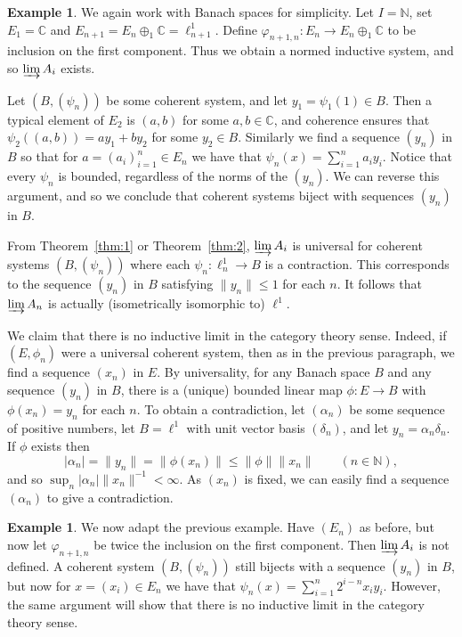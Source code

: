 \documentclass[a4paper,11pt]{article}
\newcommand{\indlim}{\varinjlim}
\theoremstyle{definition}
\newtheorem{example}[lemma]{Example}
\begin{document}
\begin{example}\label{ex:4}
We again work with Banach spaces for simplicity.
Let $I=\mathbb N$, set $E_1 = \mathbb C$ and $E_{n+1} = E_n \oplus_1 \mathbb C = \ell^1_{n+1}$.
Define $\varphi_{n+1,n} : E_n \rightarrow E_n \oplus_1 \mathbb C$ to be inclusion on the first
component.  Thus we obtain a normed inductive system, and so $\indlim A_i$ exists.

Let $(B,(\psi_n))$ be some coherent system, and let $y_1 = \psi_1(1) \in B$.  Then a typical element
of $E_2$ is $(a,b)$ for some $a,b\in\mathbb C$, and coherence ensures that $\psi_2((a,b)) = ay_1 +
by_2$ for some $y_2\in B$.  Similarly we find a sequence $(y_n)$ in $B$ so that for
$a = (a_i)_{i=1}^n \in E_n$ we have that $\psi_n(x) = \sum_{i=1}^n a_i y_i$.  Notice that every
$\psi_n$ is bounded, regardless of the norms of the $(y_n)$.  We can reverse this argument, and so
we conclude that coherent systems biject with sequences $(y_n)$ in $B$.

From Theorem~\ref{thm:1} or Theorem~\ref{thm:2}, $\indlim A_i$ is universal for coherent systems
$(B,(\psi_n))$ where each $\psi_n:\ell^1_n\rightarrow B$ is a contraction.  This corresponds to the
sequence $(y_n)$ in $B$ satisfying $\|y_n\|\leq 1$ for each $n$.  It follows that $\indlim A_n$ is
actually (isometrically isomorphic to) $\ell^1$.

We claim that there is no inductive limit in the category theory sense.  Indeed, if $(E,\phi_n)$
were a universal coherent system, then as in the previous paragraph, we find a sequence $(x_n)$ in
$E$.  By universality, for any Banach space $B$ and any sequence $(y_n)$ in $B$, there is a
(unique) bounded linear map $\phi:E\rightarrow B$ with $\phi(x_n) = y_n$ for each $n$.  To obtain a
contradiction, let $(\alpha_n)$ be some sequence of positive numbers, let $B=\ell^1$ with unit
vector basis $(\delta_n)$, and let $y_n = \alpha_n \delta_n$.  If $\phi$ exists then
\[ |\alpha_n| = \|y_n\| = \|\phi(x_n)\| \leq \|\phi\| \|x_n\| \qquad (n\in\mathbb N), \]
and so $\sup_n |\alpha_n| \|x_n\|^{-1} < \infty$.  As $(x_n)$ is fixed, we can easily find a
sequence $(\alpha_n)$ to give a contradiction.
\end{example}

\begin{example}
We now adapt the previous example.  Have $(E_n)$ as before, but now let $\varphi_{n+1,n}$ be twice
the inclusion on the first component.  Then $\indlim A_i$ is not defined.  A coherent system
$(B,(\psi_n))$ still bijects with a sequence $(y_n)$ in $B$, but now for $x = (x_i) \in E_n$ we
have that $\psi_n(x) = \sum_{i=1}^n 2^{i-n} x_i y_i$.  However, the same argument will show that
there is no inductive limit in the category theory sense.
\end{example}
\end{document}
